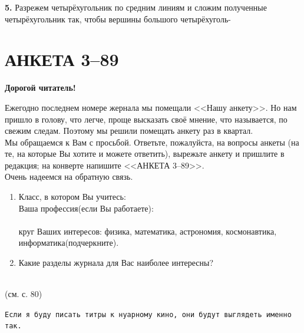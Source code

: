 \begin{multicols*}{2}
\begin{spacing}{0.9}
	\noindent \textbf{5.} Разрежем четырёхугольник по средним линиям и сложим полученные четырёхугольник так, чтобы вершины большого четырёхуголь-
	\end{spacing}
	
	\vspace{2.5cm}
	
	\section*{АНКЕТА 3--89}
	
	\textbf{Дорогой читатель!}
	
	\begin{spacing}{0.9}
		\noindent Ежегодно последнем номере жернала мы помещали <<Нашу анкету>>. Но нам пришло в голову, что легче, проще высказать своё мнение, что называется, по свежим следам. Поэтому мы решили помещать анкету раз в квартал.\\		
		Мы обращаемся к Вам с просьбой. Ответьте, пожалуйста, на вопросы анкеты (на те, на которые Вы хотите и можете ответить), вырежьте анкету и пришлите в редакция; на конверте напишите <<АНКЕТА 3--89>>.\\		
		Очень надеемся на обратную связь.
		
		\vspace{5mm}
		
		\begin{enumerate}
			\item Класс, в котором Вы учитесь: \hrulefill \\
				Ваша профессия(если Вы работаете): \hrulefill \\ 
				\phantom{\hspace{-1mm}} {\hrulefill} \\
				круг Ваших интересов: физика, математика, астрономия, космонавтика, информатика(подчеркните).
			\item Какие разделы журнала для Вас наиболее интересны? \hrulefill \\
				\phantom{\hspace{-1mm}} {\hrulefill} \\
		\end{enumerate}
	
	\begin{flushright}
		\scriptsize (см. с. 80)
	\end{flushright} 

	\end{spacing}
\end{multicols*}

\texttt{Если я буду писать титры к нуарному кино, они будут выглядеть именно так.}



